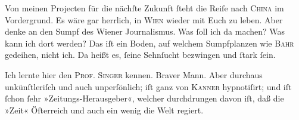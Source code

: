 \pstart
           Von meinen Projecten für die nächſte Zukunft ſteht die Reiſe nach \textsc{China} im Vordergrund. Es wäre gar herrlich, in \textsc{Wien} wieder mit Euch zu leben. Aber denke an den Sumpf des Wiener Journalismus. {\pb}Was ſoll
               ich da machen? Was kann ich dort werden? Das iſt ein Boden, auf welchem Sumpfplanzen
               wie \textsc{Bahr} gedeihen, nicht ich. Da heißt es, ſeine Sehnſucht bezwingen und ſtark ſein.\pend
           
\pstart
           Ich lernte hier den \textsc{Prof. Singer} kennen. Braver Mann. Aber durchaus unkünſtleriſch und auch unperſönlich; iſt
               ganz von \textsc{Kanner} hypnotiſirt; und iſt ſchon ſehr »Zeitungs-Herausgeber«, welcher durchdrungen davon iſt, daß
               die »Zeit« Öſterreich und auch ein wenig die Welt regiert.\pend
           

